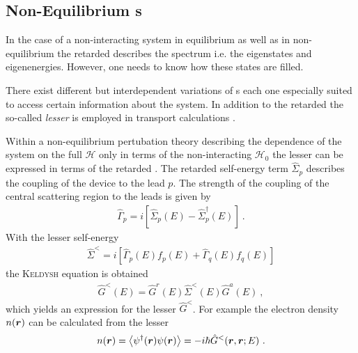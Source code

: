 \subsection{Non-Equilibrium \cgfnc s}
In the case of a non-interacting system in equilibrium as well as in non-equilibrium the retarded \gfnc{} describes the spectrum i.e. the eigenstates and eigenenergies. However, one needs to know how these states are filled.\par
There exist different but interdependent variations of \gfnc s each one especially suited to access certain information about the system.
In addition to the retarded \gfnc{} the so-called \emph{lesser \gfnc{}} is employed in transport calculations \cite{haug2008quantum}.\par
Within a non-equilibrium pertubation theory describing the dependence of the system on the full \hamil{} $\mathcal{H}$ only in terms of the non-interacting \hamil{} $\mathcal{H}_0$ \cite{Jauho2006} the lesser \gfnc{} can be expressed in terms of the retarded \gfnc{}. The retarded self-energy term $\hat{\Sigma}_p$ describes the coupling of the device to the lead $p$. The strength of the coupling of the central scattering region to the leads is given by \cite{datta2005quantum}
\begin{align}
\hat{\Gamma}_p = i\left[\hat{\Sigma}_p(E)-\hat{\Sigma}_p^{\dagger}(E)\right]\ .
\end{align}
With the lesser self-energy
\begin{align}
\hat{\Sigma}^<=i\left[\hat{\Gamma}_p(E)f_p(E)+\hat{\Gamma}_q(E)f_q(E) \right]
\label{eqn:lesserselfenergy}
\end{align}
the \textsc{Keldysh} equation is obtained
\begin{align}
\hat{G}^<(E) = \hat{G}^r(E) \hat{\Sigma}^<(E) \hat{G}^a(E)\ ,
\label{eqn:keldyshequation}
\end{align}
which yields an expression for the lesser \gfnc{} $\hat{G}^<$.
For example the electron density  $n(\boldsymbol{r})$ can be calculated from the lesser \gfnc{}
\begin{align}
	n(\boldsymbol{r}) = \left< \psi^{\dagger} (\boldsymbol{r}) \psi(\boldsymbol{r})\right> = -i\hbar \hat{G}^<(\boldsymbol{r},\boldsymbol{r};E)\ .
	\label{eqn:edensfromgreensfnc}
\end{align}

